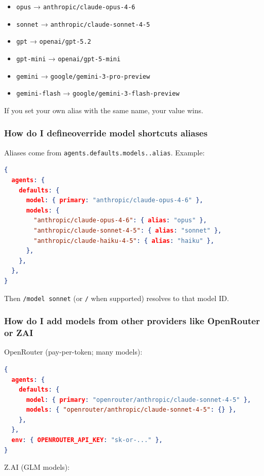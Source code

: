 \begin{itemize}
  \item \texttt{opus} → \texttt{anthropic/claude-opus-4-6}
  \item \texttt{sonnet} → \texttt{anthropic/claude-sonnet-4-5}
  \item \texttt{gpt} → \texttt{openai/gpt-5.2}
  \item \texttt{gpt-mini} → \texttt{openai/gpt-5-mini}
  \item \texttt{gemini} → \texttt{google/gemini-3-pro-preview}
  \item \texttt{gemini-flash} → \texttt{google/gemini-3-flash-preview}
\end{itemize}


If you set your own alias with the same name, your value wins.

\subsubsection{How do I defineoverride model shortcuts aliases}


Aliases come from \texttt{agents.defaults.models..alias}. Example:

\begin{lstlisting}[language=json]
{
  agents: {
    defaults: {
      model: { primary: "anthropic/claude-opus-4-6" },
      models: {
        "anthropic/claude-opus-4-6": { alias: "opus" },
        "anthropic/claude-sonnet-4-5": { alias: "sonnet" },
        "anthropic/claude-haiku-4-5": { alias: "haiku" },
      },
    },
  },
}
\end{lstlisting}


Then \texttt{/model sonnet} (or \texttt{/} when supported) resolves to that model ID.

\subsubsection{How do I add models from other providers like OpenRouter or ZAI}


OpenRouter (pay-per-token; many models):

\begin{lstlisting}[language=json]
{
  agents: {
    defaults: {
      model: { primary: "openrouter/anthropic/claude-sonnet-4-5" },
      models: { "openrouter/anthropic/claude-sonnet-4-5": {} },
    },
  },
  env: { OPENROUTER_API_KEY: "sk-or-..." },
}
\end{lstlisting}


Z.AI (GLM models):

